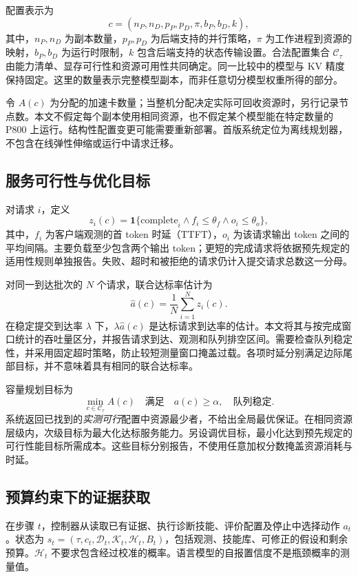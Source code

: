 \documentclass[UTF8,11pt,a4paper,fontset=windows]{ctexart}
\begin{document}
配置表示为
\begin{equation}
 c=(n_P,n_D,p_P,p_D,\pi,b_P,b_D,k),
\end{equation}
其中，$n_P,n_D$ 为副本数量，$p_P,p_D$ 为后端支持的并行策略，$\pi$ 为工作进程到资源的映射，$b_P,b_D$ 为运行时限制，$k$ 包含后端支持的状态传输设置。合法配置集合 $\mathcal{C}_{\tau}$ 由能力清单、显存可行性和资源可用性共同确定。同一比较中的模型与 KV 精度保持固定。这里的数量表示完整模型副本，而非任意切分模型权重所得的部分。

令 $A(c)$ 为分配的加速卡数量；当整机分配决定实际可回收资源时，另行记录节点数。本文不假定每个副本使用相同资源，也不假定某个模型能在特定数量的 P800 上运行。结构性配置变更可能需要重新部署。首版系统定位为离线规划器，不包含在线弹性伸缩或运行中请求迁移。

\subsection{服务可行性与优化目标}
对请求 $i$，定义
\begin{equation}
 z_i(c)=\mathbf{1}\{\text{complete}_i \land f_i\leq\theta_f
                  \land o_i\leq\theta_o\},
\end{equation}
其中，$f_i$ 为客户端观测的首 token 时延（TTFT），$o_i$ 为该请求输出 token 之间的平均间隔。主要负载至少包含两个输出 token；更短的完成请求将依据预先规定的适用性规则单独报告。失败、超时和被拒绝的请求仍计入提交请求总数这一分母。

对同一到达批次的 $N$ 个请求，联合达标率估计为
\begin{equation}
 \widehat a(c)=\frac{1}{N}\sum_{i=1}^{N}z_i(c).
\end{equation}
在稳定提交到达率 $\lambda$ 下，$\lambda\widehat a(c)$ 是达标请求到达率的估计。本文将其与按完成窗口统计的吞吐量区分，并报告请求到达、观测和队列排空区间。需要检查队列稳定性，并采用固定超时策略，防止较短测量窗口掩盖过载。各项时延分别满足边际尾部目标，并不意味着具有相同的联合达标率。

容量规划目标为
\begin{equation}
 \min_{c\in\mathcal{C}_{\tau}} A(c)
 \quad\text{满足}\quad
 a(c)\geq\alpha,\quad\text{队列稳定}.
 \label{eq:capacity}
\end{equation}
系统返回已找到的\emph{实测可行}配置中资源最少者，不给出全局最优保证。在相同资源层级内，次级目标为最大化达标服务能力。另设调优目标，最小化达到预先规定的可行性能目标所需成本。这些目标分别报告，不使用任意加权分数掩盖资源消耗与时延。

\subsection{预算约束下的证据获取}
在步骤 $t$，控制器从读取已有证据、执行诊断技能、评价配置及停止中选择动作 $a_t$。状态为 $s_t=(\tau,c_t,\mathcal{D}_t,\mathcal{K}_t,\mathcal{H}_t,B_t)$，包括观测、技能库、可修正的假设和剩余预算。$\mathcal{H}_t$ 不要求包含经过校准的概率。语言模型的自报置信度不是瓶颈概率的测量值。
\end{document}
